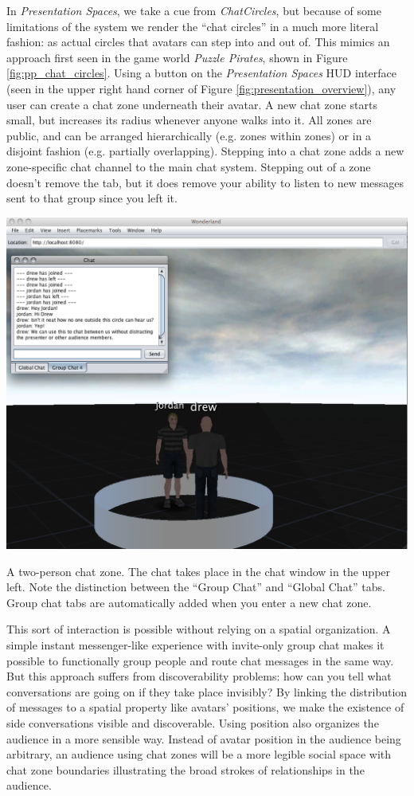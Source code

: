In \emph{Presentation Spaces}, we take a cue from \emph{ChatCircles}, but because of some limitations of the system we render the ``chat circles'' in a much more literal fashion: as actual circles that avatars can step into and out of. This mimics an approach first seen in the game world \emph{Puzzle Pirates}, shown in Figure \ref{fig:pp_chat_circles}. Using a button on the \emph{Presentation Spaces} HUD interface (seen in the upper right hand corner of Figure \ref{fig:presentation_overview}), any user can create a chat zone underneath their avatar. A new chat zone starts small, but increases its radius whenever anyone walks into it. All zones are public, and can be arranged hierarchically (e.g. zones within zones) or in a disjoint fashion (e.g. partially overlapping). Stepping into a chat zone adds a new zone-specific chat channel to the main chat system. Stepping out of a zone doesn't remove the tab, but it does remove your ability to listen to new messages sent to that group since you left it.

\begin{marginfigure}
	\includegraphics{figures/chat-zones.png}
	\caption{A two-person chat zone. The chat takes place in the chat window in the upper left. Note the distinction between the ``Group Chat'' and ``Global Chat'' tabs. Group chat tabs are automatically added when you enter a new chat zone.}
	\label{fig:chat_zones}
\end{marginfigure}

This sort of interaction is possible without relying on a spatial organization. A simple instant messenger-like experience with invite-only group chat makes it possible to functionally group people and route chat messages in the same way. But this approach suffers from discoverability problems: how can you tell what conversations are going on if they take place invisibly? By linking the distribution of messages to a spatial property like avatars' positions, we make the existence of side conversations visible and discoverable. Using position also organizes the audience in a more sensible way. Instead of avatar position in the audience being arbitrary, an audience using chat zones will be a more legible social space with chat zone boundaries illustrating the broad strokes of relationships in the audience. 


